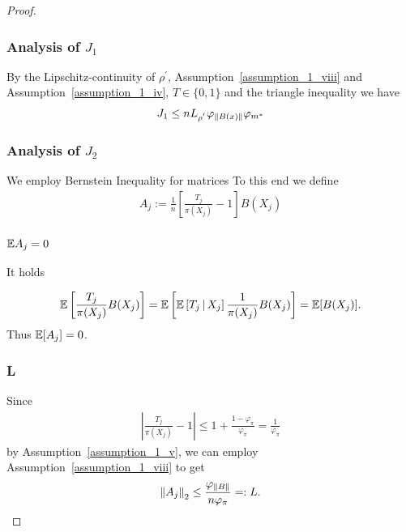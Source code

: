 \begin{proof}
\subsubsection*{Analysis of $J_1$}

By the Lipschitz-continuity of 
$\rho^{'}$,
Assumption~\ref{assumption_1_viii}
and
Assumption~\ref{assumption_1_iv},
$T \in \{0, 1\}$
and 
the triangle inequality 
we have
\begin{gather}
  J_1 
  \le
  n L_{\rho^{'}}\varphi_{\left\lVert B(x)\right\rVert} \varphi_{m^*}
\end{gather}

\subsubsection*{Analysis of $J_2$}
We employ Bernstein Inequality for matrices
To this end we define
\begin{gather}
  A_j
  :=
      \frac{1}{n}
      \left[ 
        \frac{T_j}{\pi(X_j)}
      -
      1
      \right]
      B(X_j)
\end{gather}

\subsubsection*{$\mathbb{E} A_j = 0$}

It holds

\begin{gather}
  \mathbb{E}
  \left[  
    \frac{T_j}{\pi(X_j)}
    B(X_j)
  \right]
  =
  \mathbb{E}
  \left[  
    \mathbb{E}
    \left[  
      T_j
      \, | \,
      X_j
    \right]
    \frac{1}{\pi(X_j)}
    B(X_j)
  \right]
  =
  \mathbb{E}[B(X_j)]. 
\end{gather}
Thus 
$\mathbb{E}[A_j] = 0$.
\subsubsection*{L}
Since
\begin{gather}
  \left| 
      \frac{T_j}{\pi(X_j)}
      -
      1
      \right|
  \le
  1 + \frac{1 - \varphi_{\pi}}{\varphi_{\pi}}
  =
  \frac{1}{\varphi_{\pi}}
\end{gather}
by Assumption~\ref{assumption_1_v},
we can employ Assumption~\ref{assumption_1_viii}
to get
\begin{gather}
  \left\lVert A_j\right\rVert_2
  \le
  \frac{\varphi_{\left\lVert B\right\rVert}}{n \varphi_{\pi}}
  =:
  L.
\end{gather}

\end{proof}
